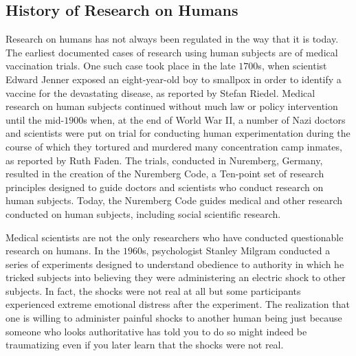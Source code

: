 \subsection{History of Research on Humans}

Research on humans has not always been regulated in the way that it is today. The earliest documented cases of research using human subjects are of medical vaccination trials. One such case took place in the late $ 1700 $s, when scientist Edward Jenner exposed an eight-year-old boy to smallpox in order to identify a vaccine for the devastating disease, as reported by Stefan Riedel\cite{riedel2005edward}. Medical research on human subjects continued without much law or policy intervention until the mid-$ 1900 $s when, at the end of World War II, a number of Nazi doctors and scientists were put on trial for conducting human experimentation during the course of which they tortured and murdered many concentration camp inmates, as reported by Ruth Faden\cite{faden1986history}. The trials, conducted in Nuremberg, Germany, resulted in the creation of the Nuremberg Code, a Ten-point set of research principles designed to guide doctors and scientists who conduct research on human subjects. Today, the Nuremberg Code guides medical and other research conducted on human subjects, including social scientific research.

Medical scientists are not the only researchers who have conducted questionable research on humans. In the $ 1960 $s, psychologist Stanley Milgram conducted a series of experiments designed to understand obedience to authority in which he tricked subjects into believing they were administering an electric shock to other subjects\cite{milgram1963behavioral}. In fact, the shocks were not real at all but some participants experienced extreme emotional distress after the experiment. The realization that one is willing to administer painful shocks to another human being just because someone who looks authoritative has told you to do so might indeed be traumatizing even if you later learn that the shocks were not real.

